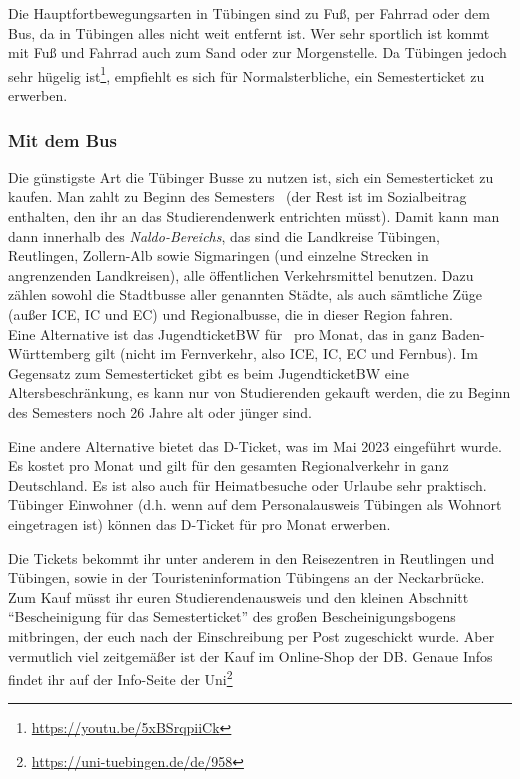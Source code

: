 Die Hauptfortbewegungsarten in Tübingen sind zu Fuß, per Fahrrad oder dem Bus, da in Tübingen alles nicht weit entfernt ist. Wer sehr sportlich ist kommt mit Fuß und Fahrrad auch zum Sand oder zur Morgenstelle. Da Tübingen jedoch sehr hügelig ist\footnote{\url{https://youtu.be/5xBSrqpiiCk}}, empfiehlt es sich für Normalsterbliche, ein Semesterticket zu erwerben.	%
\vfill \pagebreak
\subsubsection*{Mit dem Bus}
Die günstigste Art die Tübinger Busse zu nutzen ist, sich ein Semesterticket zu kaufen. Man zahlt zu Beginn des
Semesters \semesterticketpreis \ (der Rest ist im Sozialbeitrag enthalten, den ihr an das Studierendenwerk entrichten müsst).
Damit kann man dann innerhalb des \emph{Naldo-Bereichs}, das sind die Landkreise Tübingen, Reutlingen, Zollern-Alb
sowie Sigmaringen (und einzelne Strecken in angrenzenden Landkreisen), alle öffentlichen Verkehrsmittel benutzen.
Dazu zählen sowohl die Stadtbusse aller genannten Städte, als auch sämtliche Züge (außer ICE, IC und EC) und Regionalbusse,
die in dieser Region fahren. \\
Eine Alternative ist das JugendticketBW für \jugendticketbwpreis \ pro Monat,
das in ganz Baden-Württemberg gilt (nicht im Fernverkehr, also ICE, IC, EC und Fernbus).
Im Gegensatz zum Semesterticket gibt es beim JugendticketBW eine Altersbeschränkung,
es kann nur von Studierenden gekauft werden, die zu Beginn des Semesters noch 26 Jahre alt oder jünger sind.

Eine andere Alternative bietet das D-Ticket, was im Mai 2023 eingeführt wurde. Es kostet \dticketpreis pro Monat und gilt für den
gesamten Regionalverkehr in ganz Deutschland. Es ist also auch für Heimatbesuche oder Urlaube sehr praktisch. Tübinger Einwohner
(d.h. wenn auf dem Personalausweis Tübingen als Wohnort eingetragen ist) können das D-Ticket für \dtickettuebingenpreis pro Monat erwerben.

Die Tickets bekommt ihr unter anderem in den Reisezentren in Reutlingen und Tübingen, sowie in der Touristeninformation
Tübingens an der Neckarbrücke. Zum Kauf müsst ihr euren Studierendenausweis und den kleinen Abschnitt "`Bescheinigung für
das Semesterticket"' des großen Bescheinigungsbogens mitbringen, der euch nach der Einschreibung per Post zugeschickt
wurde. Aber vermutlich viel zeitgemäßer ist der Kauf im Online-Shop der DB. Genaue Infos findet ihr auf der Info-Seite
der Uni\footnote{\url{https://uni-tuebingen.de/de/958}}

